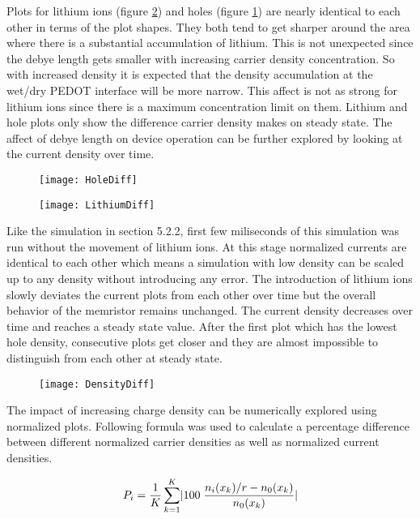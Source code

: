 {Plots for lithium ions (figure \ref{LithiumDiff}) and holes (figure \ref{HoleDiff}) are nearly identical to each other in terms of the plot shapes. They both tend to get sharper around the area where there is a substantial accumulation of lithium. This is not unexpected since the debye length gets smaller with increasing carrier density concentration. So with increased density it is expected that the density accumulation at the wet/dry PEDOT interface will be more narrow. This affect is not as strong for lithium ions since there is a maximum concentration limit on them. Lithium and hole plots only show the difference carrier density makes on steady state. The affect of debye length on device operation can be further explored by looking at the current density over time.   

\begin{figure}[!htp]
\centering
\texttt{[image: HoleDiff]}
\caption{} 
\label{HoleDiff}
\end{figure}

\begin{figure}[!htp]
\centering
\texttt{[image: LithiumDiff]}
\caption{} 
\label{LithiumDiff}
\end{figure}

Like the simulation in section 5.2.2, first few miliseconds of this simulation was run without the movement of lithium ions. At this stage normalized currents are identical to each other which means a simulation with low density can be scaled up to any density without introducing any error. The introduction of lithium ions slowly deviates the current plots from each other over time but the overall behavior of the memristor remains unchanged. The current density decreases over time and reaches a steady state value. After the first plot which has the lowest hole density, consecutive plots get closer and they are almost impossible to distinguish from each other at steady state.

\begin{figure}[!htp]
\centering
\texttt{[image: DensityDiff]}
\caption{} 
\label{DensityDiff}
\end{figure}

The impact of increasing charge density can be numerically explored using normalized plots. Following formula was used to calculate a percentage difference between different normalized carrier densities as well as normalized current densities. 


\begin{equation}
\centering
P_i = \frac{1}{ K}\sum_{k=1}^{K}\lvert 100 \;\frac{n_{i}(x_k)/r-n_{0}(x_k)}{n_{0}(x_k)}\rvert
\end{equation}

}
